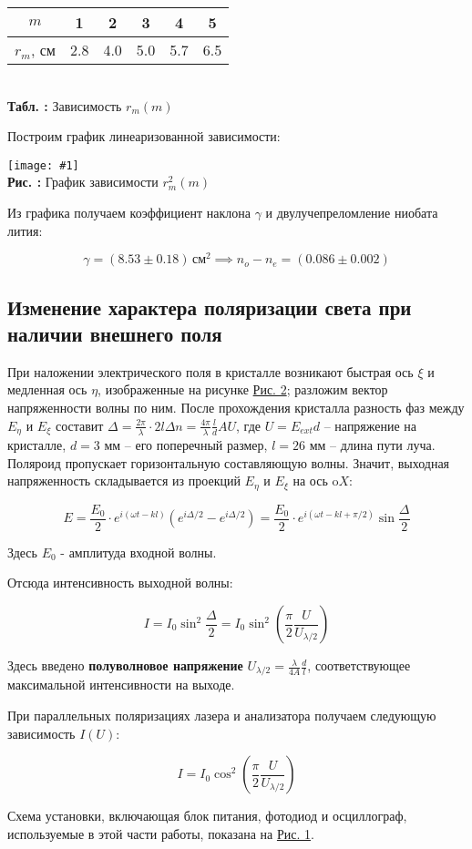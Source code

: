 \documentclass[12pt,a4paper]{article}
\newcounter{picture}
\newcounter{tbl}
\newcommand{\embedeps}[3]{\begin{center}
		\texttt{[image: \#1]}
		\\\textbf{Рис. \thepicture:} #3
		\label{pic_\thepicture}
		\addtocounter{picture}{1}
\end{center}}
\newcommand{\embedtbl}[3]{\begin{center}
		\begin{tabular}{#1}
			#2
		\end{tabular}
		\\\textbf{Табл. \thetbl:} #3
		\label{tbl_\thetbl}
		\addtocounter{tbl}{1}
\end{center}}
\newcommand{\picref}[1]{\hyperref[pic_#1]{Рис. #1}}
\begin{document}
	\embedtbl{|c|c|c|c|c|c|}{
		\hline
		$m$ & 1 & 2 & 3 & 4 & 5
		\\\hline
		$r_m$, см & 2.8 & 4.0 & 5.0 & 5.7 & 6.5
		\\\hline
	}{Зависимость $r_m(m)$}

	Построим график линеаризованной зависимости:
	
	\embedeps{PIC_5.eps}{0.6}{График зависимости $r_m^2(m)$}
	
	Из графика получаем коэффициент наклона $\gamma$ и двулучепреломление ниобата лития:
	
	$$ \gamma = (8.53 \pm 0.18)\, \text{см}^2 \implies n_o - n_e = (0.086 \pm 0.002)$$
	
	\subsection{Изменение характера поляризации света при наличии внешнего поля}
	
	При наложении электрического поля в кристалле возникают быстрая ось $\xi$ и медленная ось $\eta$, изображенные на рисунке \picref{2}; разложим вектор напряженности волны по ним. После прохождения кристалла разность фаз между $E_\eta$ и $E_\xi$ составит $\Delta = \frac{2\pi}{\lambda} \cdot2l\Delta n = \frac{4\pi}{\lambda} \frac{l}{d} AU$, где $U = E_{ext}d$ -- напряжение на кристалле, $d = 3$ мм -- его поперечный размер, $l = 26$ мм -- длина пути луча. Поляроид пропускает горизонтальную составляющую волны. Значит, выходная напряженность складывается из проекций $E_\eta$ и $E_\xi$ на ось $\mathrm{o}X$:
	
	$$ E = \frac{E_0}{2} \cdot e^{i(\omega t - kl)} (e^{i\Delta/2} - e^{i\Delta/2}) = \frac{E_0}{2} \cdot  e^{i(\omega t - kl + \pi/2)} \sin\frac{\Delta}{2} $$
	
	Здесь $E_0$ - амплитуда входной волны.
	
	Отсюда интенсивность выходной волны: 
	
	$$ I = I_0 \sin^2\frac{\Delta}{2} = I_0\sin^2 \left(\frac{\pi}{2}\frac{U}{U_{\lambda/2}}\right) $$
	
	Здесь введено \textbf{полуволновое напряжение} $U_{\lambda/2} = \frac{\lambda}{4A}\frac{d}{l}$, соответствующее максимальной интенсивности на выходе.
	
	При параллельных поляризациях лазера и анализатора получаем следующую зависимость $I(U)$:
	
	$$ I = I_0 \cos^2\left(\frac{\pi}{2}\frac{U}{U_{\lambda/2}}\right) $$
	
	Схема установки, включающая блок питания, фотодиод и осциллограф, используемые в этой части работы, показана на \picref{1}.  
	
\end{document}
